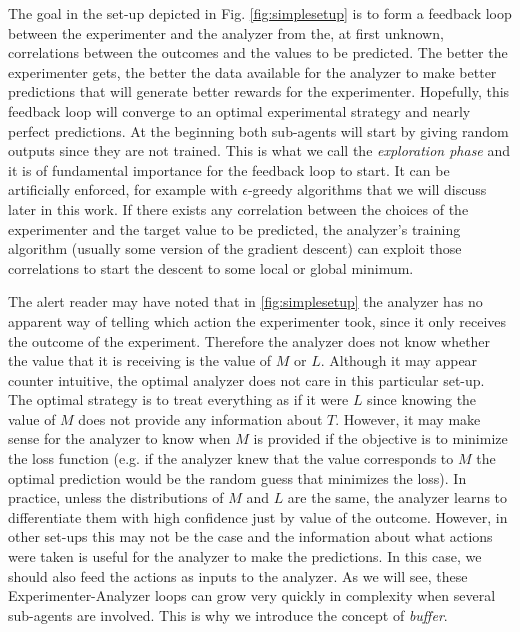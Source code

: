 \documentclass[11pt,a4paper,twoside]{report}
\newcommand{\+}{\textnormal{+} }
\theoremstyle{definition}
\numberwithin{equation}{chapter}
\begin{document}
The goal in the set-up depicted in Fig. \ref{fig:simplesetup} is to form a
feedback loop between the experimenter and the analyzer from the, at first
unknown, correlations between the outcomes and the values to be predicted. The
better the experimenter gets, the better the data available for the analyzer to
make better predictions that will generate better rewards for the experimenter.
Hopefully, this feedback loop will converge to an optimal experimental strategy
and nearly perfect predictions. At the beginning both sub-agents will
start by giving random outputs since they are not trained. This is what we call
the \textit{exploration phase} and it is of fundamental importance for the
feedback loop to start. It can be artificially enforced, for example with
$\epsilon$-greedy algorithms that we will discuss later in this work. If there
exists any correlation between the choices of the experimenter and the target
value to be predicted, the analyzer's training algorithm (usually some version
of the gradient descent) can exploit those correlations to start the descent to some
local or global minimum.

The alert reader may have noted that in \ref{fig:simplesetup} the analyzer has
no apparent way of telling which action the experimenter took, since it only
receives the outcome of the experiment. Therefore the analyzer does not know
whether the value that it is receiving is the value of $M$ or $L$. Although it
may appear counter intuitive, the optimal analyzer does not care in this
particular set-up. The optimal strategy is to treat everything as if it were $L$
since knowing the value of $M$ does not provide any information about $T$.
However, it may make sense for the analyzer to know when $M$ is provided if the
objective is to minimize the loss function (e.g. if the analyzer knew that the
value corresponds to $M$ the optimal prediction would be the random guess that
minimizes the loss). In practice, unless the distributions of $M$ and $L$ are
the same, the analyzer learns to differentiate them with high confidence just by
value of the outcome. However, in other set-ups this may not be the case and the
information about what actions were taken is useful for the analyzer to make the
predictions. In this case, we should also feed the actions as inputs to the
analyzer. As we will see, these Experimenter-Analyzer loops can grow very quickly
in complexity when several sub-agents are involved. This is why we introduce the
concept of \textit{buffer}.
\end{document}
